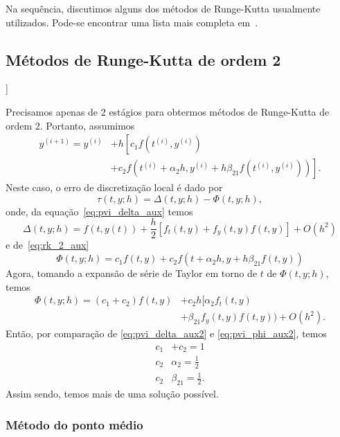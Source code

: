 Na sequência, discutimos alguns dos métodos de Runge-Kutta usualmente utilizados. Pode-se encontrar uma lista mais completa em~\cite[Cap. 8, Seç. 3.2]{Isaacson1994a}.

\subsection{Métodos de Runge-Kutta de ordem 2}

\begin{flushleft}
  [[tag:revisar]]
\end{flushleft}

Precisamos apenas de $2$ estágios para obtermos métodos de Runge-Kutta de ordem 2. Portanto, assumimos
\begin{align}
  y^{(i+1)} = y^{(i)} &+ h\left[c_1f(t^{(i)},y^{(i)}) \right.\nonumber\\
  &\left. + c_2f(t^{(i)}+\alpha_2h,y^{(i)}+h\beta_{21}f(t^{(i)},y^{(i)}))\right].\label{eq:rk_2_aux}
\end{align}
Neste caso, o erro de discretização local é dado por
\begin{equation}
  \tau(t,y;h) = \Delta(t,y;h) - \Phi(t,y;h),
\end{equation}
onde, da equação~\eqref{eq:pvi_delta_aux} temos
\begin{equation}\label{eq:pvi_delta_aux2}
  \Delta(t,y;h) = f(t,y(t)) + \frac{h}{2}[f_t(t,y) + f_y(t,y)f(t,y)] + O(h^2)
\end{equation}
e de~\eqref{eq:rk_2_aux}
\begin{equation}
  \Phi(t,y;h) = c_1f(t,y) + c_2f(t+\alpha_2h,y+h\beta_{21}f(t,y))
\end{equation}
Agora, tomando a expansão de série de Taylor em torno de $t$ de $\Phi(t,y;h)$, temos
\begin{align}\label{eq:pvi_phi_aux2}
  \Phi(t,y;h) = (c_1+c_2)f(t,y) &+ c_2h[\alpha_2f_t(t,y) \nonumber\\
  &+\beta_{21}f_y(t,y)f(t,y)) + O(h^2).
\end{align}
Então, por comparação de \eqref{eq:pvi_delta_aux2} e \eqref{eq:pvi_phi_aux2}, temos
\begin{align}
  c_1&+c_2 = 1\\
  c_2&\alpha_2 = \frac{1}{2}\\
  c_2&\beta_{21} = \frac{1}{2}.
\end{align}
Assim sendo, temos mais de uma solução possível.

\subsubsection{Método do ponto médio}

